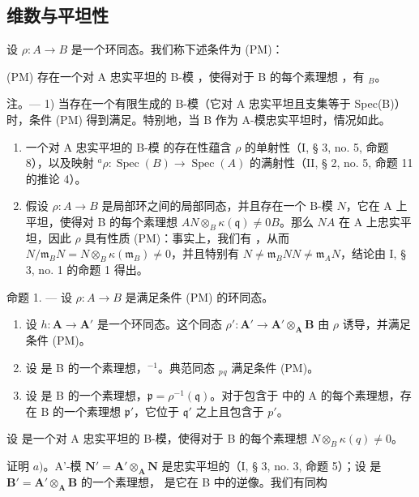 \subsection{维数与平坦性}

设 \(\rho: A \to B\) 是一个环同态。我们称下述条件为 (PM)：

(PM) 存在一个对 A 忠实平坦的 B-模  ，使得对于 B 的每个素理想  ，有 \(_{B}\)。

注。--- 1) 当存在一个有限生成的 B-模（它对 A 忠实平坦且支集等于 Spec(B)）时，条件 (PM) 得到满足。特别地，当 B 作为 A-模忠实平坦时，情况如此。

\begin{enumerate}
\def\labelenumi{\arabic{enumi})}
\setcounter{enumi}{1}
\item
  一个对 A 忠实平坦的 B-模  的存在性蕴含 \(\rho\) 的单射性（I, § 3, no. 5, 命题 8），以及映射 \({}^{a}\rho : \operatorname{Spec}(B) \to \operatorname{Spec}(A)\) 的满射性（II, § 2, no. 5, 命题 11 的推论 4）。
\item
假设 \(\rho: A \to B\) 是局部环之间的局部同态，并且存在一个 B-模 \(N\)，它在 A 上平坦，使得对 B 的每个素理想 \(A\)\(N \otimes_B \kappa(\mathfrak{q}) \neq 0\)\(B\)。那么 \(N\)\(A\) 在 A 上忠实平坦，因此 \(\rho\) 具有性质 (PM)：事实上，我们有  ，从而 \(N/\mathfrak{m}_{B}N = N \otimes_B \kappa(\mathfrak{m}_{B}) \neq 0\)，并且特别有 \(N \neq \mathfrak{m}_{B}N\)\(N \neq \mathfrak{m}_{A}N\)，结论由 I, § 3, no. 1 的命题 1 得出。
\end{enumerate}

命题 1. --- 设 \(\rho: A \to B\) 是满足条件 (PM) 的环同态。

\begin{enumerate}
\def\labelenumi{\alph{enumi})}
\item
  设 \(h: \mathbf{A} \to \mathbf{A}'\) 是一个环同态。这个同态 \(\rho': \mathbf{A}' \to \mathbf{A}' \otimes_{\mathbf{A}} \mathbf{B}\) 由 \(\rho\) 诱导，并满足条件 (PM)。
\item
  设  是 B 的一个素理想，\(^{-1}\)。典范同态 \(_{p}\)\(_{q}\) 满足条件 (PM)。
\item
设  是 B 的一个素理想，\(\mathfrak{p} = \rho^{-1}(\mathfrak{q})\)。对于包含于  中的 A 的每个素理想，存在 B 的一个素理想 \(\mathfrak{p}'\)，它位于 \(\mathfrak{q}'\) 之上且包含于 \(p'\)。
\end{enumerate}

设  是一个对 A 忠实平坦的 B-模，使得对于 B 的每个素理想 \(N \otimes_{B} \kappa(q) \neq 0\)。

证明 \(a)\)。A'-模 \(\mathbf{N}' = \mathbf{A}' \otimes_{\mathbf{A}} \mathbf{N}\) 是忠实平坦的（I, § 3, no. 3, 命题 5）；设  是 \(\mathbf{B}' = \mathbf{A}' \otimes_{\mathbf{A}} \mathbf{B}\) 的一个素理想， 是它在 B 中的逆像。我们有同构

